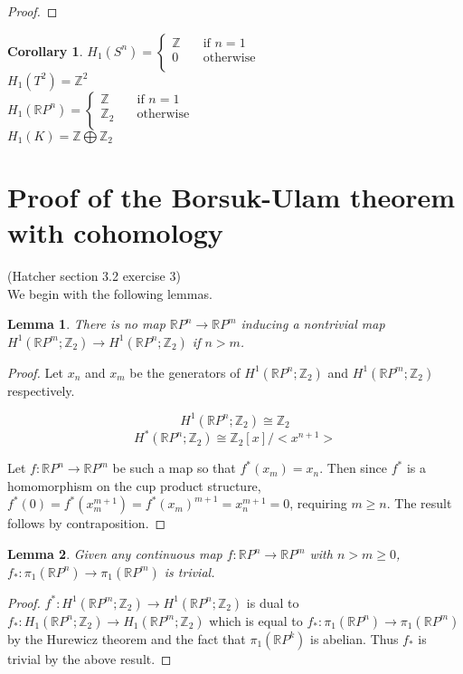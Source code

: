 \documentclass{report}
\newtheorem{lemma}{Lemma}
\newtheorem{corollary}{Corollary}
\begin{document}
\begin{proof}
\end{proof}

\begin{corollary}
$H_1(S^n)=$$\begin{cases}
       \mathbb{Z} &\quad\text{if }n=1 \\
       0 &\quad\text{otherwise} \\ 
     \end{cases}$\\
$H_1(T^2)=\mathbb{Z}^2$\\
$H_1(\mathbb{R}P^n)=$$\begin{cases}
       \mathbb{Z} &\quad\text{if }n=1 \\
       \mathbb{Z}_2 &\quad\text{otherwise} \\ 
     \end{cases}$\\
$H_1(K)=\mathbb{Z}\bigoplus\mathbb{Z}_2$
\end{corollary}

\section{Proof of the Borsuk-Ulam theorem with cohomology}

\textrm{(Hatcher section 3.2 exercise 3) \\}
We begin with the following lemmas.

\begin{lemma}
There is no map $\mathbb{R} P^n$$\rightarrow$$\mathbb{R} P^m$ inducing a nontrivial map $H^1(\mathbb{R} P^m;\mathbb{Z}_2)\rightarrow H^1(\mathbb{R} P^n;\mathbb{Z}_2)$ if $n>m$.
\end{lemma}
\begin{proof}
Let $x_n$ and $x_m$ be the generators of $H^1(\mathbb{R} P^n;\mathbb{Z}_2)$ and $H^1(\mathbb{R} P^m;\mathbb{Z}_2)$ respectively.

\[H^1(\mathbb{R} P^n;\mathbb{Z}_2)\cong \mathbb{Z}_2\] 
\[H^*(\mathbb{R} P^n;\mathbb{Z}_2)\cong \mathbb{Z}_2[x]/<x^{n+1}>\] 

\noindent Let $f\colon\mathbb{R} P^n\to\mathbb{R} P^m $ be such a map so that $f^*(x_m)=x_n$.
Then since $f^*$ is a homomorphism on the cup product structure, $f^*(0)=f^*(x_m^{m+1})=f^*(x_m)^{m+1}=x_n^{m+1}=0$, requiring $m \geq n$. The result follows by contraposition.
\end{proof}

\begin{lemma}
Given any continuous map $f\colon\mathbb{R}P^n\to \mathbb{R}P^m$ with $n>m\geq 0$, $f_*\colon\pi_1(\mathbb{R}P^n)\to \pi_1(\mathbb{R}P^m)$ is trivial.
\end{lemma}
\begin{proof}
 $f^*\colon H^1(\mathbb{R}P^m;\mathbb{Z}_2)\rightarrow H^1(\mathbb{R}P^n;\mathbb{Z}_2)$ is dual to $f_*\colon H_1(\mathbb{R}P^n;\mathbb{Z}_2)\rightarrow H_1(\mathbb{R}P^m;\mathbb{Z}_2)$ which is equal to $f_*\colon \pi_1(\mathbb{R}P^n)\rightarrow \pi_1(\mathbb{R}P^m)$ by the Hurewicz theorem and the fact that $\pi_1(\mathbb{R}P^k)$ is abelian. Thus $f_*$ is trivial by the above result.
\end{proof}
\end{document}
